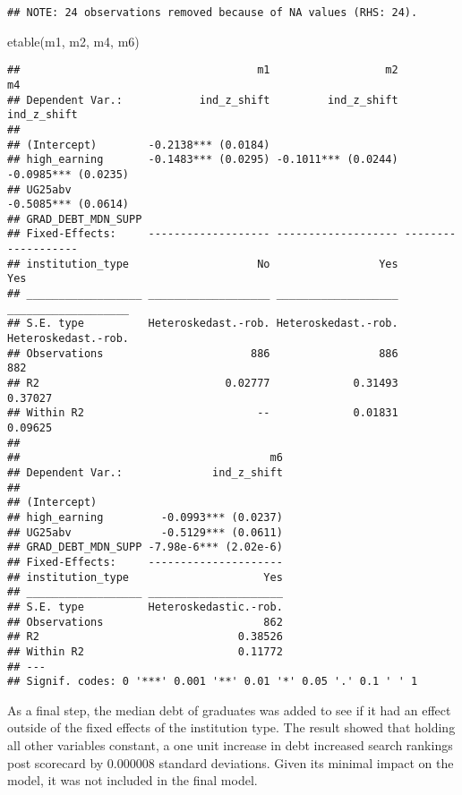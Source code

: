 \documentclass[
]{article}
\newenvironment{Shaded}{\begin{snugshade}}{\end{snugshade}}
\newcommand{\FunctionTok}[1]{\textcolor[rgb]{0.00,0.00,0.00}{#1}}
\newcommand{\NormalTok}[1]{#1}
\begin{document}
\begin{verbatim}
## NOTE: 24 observations removed because of NA values (RHS: 24).
\end{verbatim}

\begin{Shaded}
\begin{Highlighting}[]
\FunctionTok{etable}\NormalTok{(m1, m2, m4, m6)}
\end{Highlighting}
\end{Shaded}

\begin{verbatim}
##                                     m1                  m2                  m4
## Dependent Var.:            ind_z_shift         ind_z_shift         ind_z_shift
##                                                                               
## (Intercept)        -0.2138*** (0.0184)                                        
## high_earning       -0.1483*** (0.0295) -0.1011*** (0.0244) -0.0985*** (0.0235)
## UG25abv                                                    -0.5085*** (0.0614)
## GRAD_DEBT_MDN_SUPP                                                            
## Fixed-Effects:     ------------------- ------------------- -------------------
## institution_type                    No                 Yes                 Yes
## __________________ ___________________ ___________________ ___________________
## S.E. type          Heteroskedast.-rob. Heteroskedast.-rob. Heteroskedast.-rob.
## Observations                       886                 886                 882
## R2                             0.02777             0.31493             0.37027
## Within R2                           --             0.01831             0.09625
## 
##                                       m6
## Dependent Var.:              ind_z_shift
##                                         
## (Intercept)                             
## high_earning         -0.0993*** (0.0237)
## UG25abv              -0.5129*** (0.0611)
## GRAD_DEBT_MDN_SUPP -7.98e-6*** (2.02e-6)
## Fixed-Effects:     ---------------------
## institution_type                     Yes
## __________________ _____________________
## S.E. type          Heteroskedastic.-rob.
## Observations                         862
## R2                               0.38526
## Within R2                        0.11772
## ---
## Signif. codes: 0 '***' 0.001 '**' 0.01 '*' 0.05 '.' 0.1 ' ' 1
\end{verbatim}

As a final step, the median debt of graduates was added to see if it had
an effect outside of the fixed effects of the institution type. The
result showed that holding all other variables constant, a one unit
increase in debt increased search rankings post scorecard by 0.000008
standard deviations. Given its minimal impact on the model, it was not
included in the final model.
\end{document}
